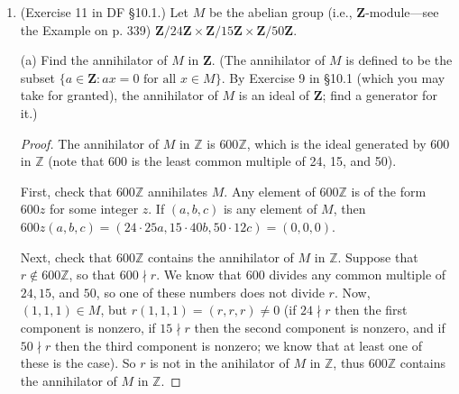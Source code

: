 \documentclass[10pt]{article}
\newcommand{\Z}{\mathbb{Z}}
\DeclareMathOperator*{\Tor}{Tor}
\begin{document}
\begin{enumerate}
\begin{proof}
Let $R = \Z / 6\Z$ and let $M$ be $R$ as a module over itself.  Then $\Tor(M) = \{ 0, 2, 3, 4 \}$ since $0 = 1\cdot 0 = 3 \cdot 2 = 2 \cdot 3 = 3 \cdot 4$, but $1$ and $5$ are relatively prime to $6$ and so are not zero divisors.  However, $2 + 3 = 5$ is not a torsion element, so $\Tor(M)$ is not closed under addition.  Thus, it is not a submodule of $M$.
\end{proof}

(c) If $R$ has zero divisors, show that every nonzero $R$-module has nonzero torsion elements.

\begin{proof}
Assume that $R$ has zero divisors, i.e. that there exist nonzero elements $a,b \in R$ such that $ab = 0$.  Let $M$ be a nonzero $R$-module, and suppose $m \in M$ is nonzero.  If $bm = 0$, then $m$ is a torsion element since $b$ is nonzero.  So assume that $bm \neq 0$.  Then $a(bm) = (ab)m = 0m = 0$, thus $bm$ is a nonzero torsion element because $a$ is nonzero.
\end{proof}

\item (Exercise 11 in DF \S 10.1.) Let $M$ be the abelian group (i.e., $\mathbf{Z}$-module---see the Example on p. 339) $\mathbf{Z}/24\mathbf{Z} \times \mathbf{Z}/15 \mathbf{Z} \times \mathbf{Z}/50\mathbf{Z}$.

(a) Find the annihilator of $M$ in $\mathbf{Z}$.  (The annihilator of $M$ is defined to be the subset $\{a \in \mathbf{Z}: ax=0 \text{ for all } x \in M\}$.  By Exercise 9 in \S 10.1 (which you may take for granted), the annihilator of $M$ is an ideal of $\mathbf{Z}$; find a generator for it.)

\begin{proof}
The annihilator of $M$ in $\Z$ is $600\Z$, which is the ideal generated by $600$ in $\Z$ (note that 600 is the least common multiple of 24, 15, and 50).

First, check that $600\Z$ annihilates $M$.  Any element of $600\Z$ is of the form $600z$ for some integer $z$.  If $(a,b,c)$ is any element of $M$, then $600z(a,b,c) = (24\cdot 25a, 15 \cdot 40b, 50 \cdot 12c) = (0,0,0)$.

Next, check that $600\Z$ contains the annihilator of $M$ in $\Z$.  Suppose that $r \not \in 600\Z$, so that $600 \nmid r$.  We know that $600$ divides any common multiple of $24, 15$, and $50$, so one of these numbers does not divide $r$.  Now, $(1,1,1) \in M$, but $r(1,1,1) = (r,r,r) \neq 0$ (if $24 \nmid r$ then the first component is nonzero, if $15 \nmid r$ then the second component is nonzero, and if $50 \nmid r$ then the third component is nonzero; we know that at least one of these is the case).  So $r$ is not in the anihilator of $M$ in $\Z$, thus $600\Z$ contains the annihilator of $M$ in $\Z$.
\end{proof}


\end{enumerate}
\end{document}
